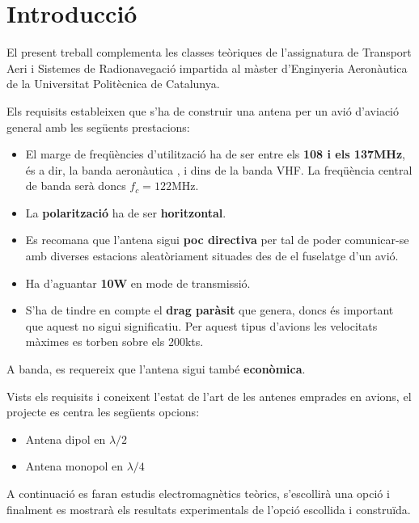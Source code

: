 \chapter{Introducció}
El present treball complementa les classes teòriques de l'assignatura de Transport Aeri i Sistemes de Radionavegació impartida al màster d'Enginyeria Aeronàutica de la Universitat Politècnica de Catalunya.

Els requisits estableixen que s'ha de construir una antena per un avió d'aviació general amb les següents prestacions:
\begin{itemize}
\item El marge de freqüències d'utilització ha de ser entre els \textbf{108 i els 137MHz}, és a dir, la banda aeronàutica \cite{Gobierno}, \cite{Union2012} i \cite{ICAO2001} dins de la banda VHF. La freqüència central de banda serà doncs $f_c = 122$MHz.
\item La \textbf{polarització} ha de ser \textbf{horitzontal}.
\item Es recomana que l'antena sigui \textbf{poc directiva} per tal de poder comunicar-se amb diverses estacions aleatòriament situades des de el fuselatge d'un avió.
\item Ha d'aguantar \textbf{10W} en mode de transmissió.
\item S'ha de tindre en compte el \textbf{drag paràsit} que genera, doncs és important que aquest no sigui significatiu. Per aquest tipus d'avions les velocitats màximes es torben sobre els 200kts.
\end{itemize}
A banda, es requereix que l'antena sigui també \textbf{econòmica}.

Vists els requisits i coneixent l'estat de l'art de les antenes emprades en avions, el projecte es centra les següents opcions:
\begin{itemize}
\item Antena dipol en $\lambda/2$
\item Antena monopol en $\lambda/4$
\end{itemize}

A continuació es faran estudis electromagnètics teòrics, s'escollirà una opció i finalment es mostrarà els resultats experimentals de l'opció escollida i construïda.